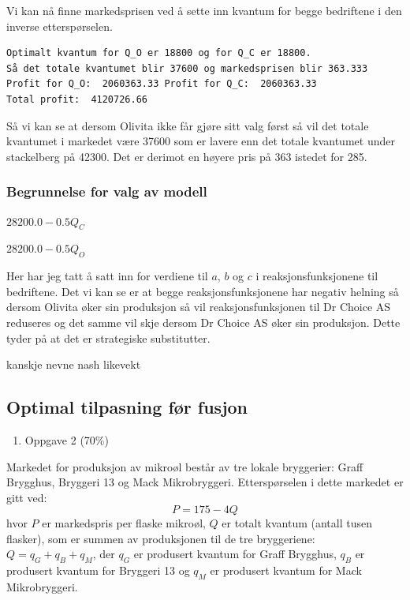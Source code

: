 \documentclass[
  12pt,
  a4paper,
  DIV=11,
  numbers=noendperiod]{scrartcl}
\providecommand{\tightlist}{%
  \setlength{\itemsep}{0pt}\setlength{\parskip}{0pt}}\usepackage{longtable,booktabs,array}
\begin{document}
Vi kan nå finne markedsprisen ved å sette inn kvantum for begge
bedriftene i den inverse etterspørselen.

\begin{verbatim}
Optimalt kvantum for Q_O er 18800 og for Q_C er 18800. 
Så det totale kvantumet blir 37600 og markedsprisen blir 363.333
Profit for Q_O:  2060363.33 Profit for Q_C:  2060363.33 
Total profit:  4120726.66
\end{verbatim}

Så vi kan se at dersom Olivita ikke får gjøre sitt valg først så vil det
totale kvantumet i markedet være 37600 som er lavere enn det totale
kvantumet under stackelberg på 42300. Det er derimot en høyere pris på
363 istedet for 285.

\subsubsection{Begrunnelse for valg av
modell}\label{begrunnelse-for-valg-av-modell}

$\displaystyle 28200.0 - 0.5 Q_{C}$

$\displaystyle 28200.0 - 0.5 Q_{O}$

Her har jeg tatt å satt inn for verdiene til \(a\), \(b\) og \(c\) i
reaksjonsfunksjonene til bedriftene. Det vi kan se er at begge
reaksjonsfunksjonene har negativ helning så dersom Olivita øker sin
produksjon så vil reaksjonsfunksjonen til Dr Choice AS reduseres og det
samme vil skje dersom Dr Choice AS øker sin produksjon. Dette tyder på
at det er strategiske substitutter.

kanskje nevne nash likevekt

\clearpage

\subsection{Optimal tilpasning før
fusjon}\label{optimal-tilpasning-fuxf8r-fusjon}

\begin{enumerate}
\def\labelenumi{\arabic{enumi}.}
\setcounter{enumi}{1}
\tightlist
\item
  Oppgave 2 (70\%)
\end{enumerate}

Markedet for produksjon av mikroøl består av tre lokale bryggerier:
Graff Brygghus, Bryggeri 13 og Mack Mikrobryggeri. Etterspørselen i
dette markedet er gitt ved: \[
P = 175-4Q
\] hvor \(P\) er markedspris per flaske mikroøl, \(Q\) er totalt kvantum
(antall tusen flasker), som er summen av produksjonen til de tre
bryggeriene: \(Q = q_G + q_B + q_M\), der \(q_G\) er produsert kvantum
for Graff Brygghus, \(q_B\) er produsert kvantum for Bryggeri 13 og
\(q_M\) er produsert kvantum for Mack Mikrobryggeri.
\end{document}
